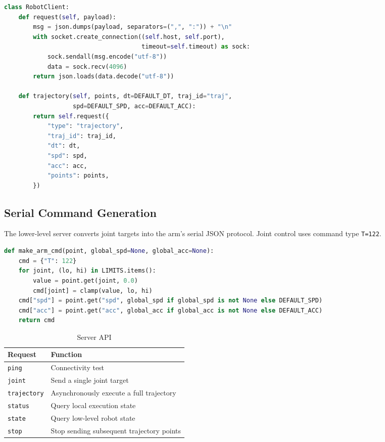 \documentclass[a4paper,12pt]{article}
\begin{document}
\begin{lstlisting}[language=Python, caption={Trajectory request in the upper-level client}]
class RobotClient:
    def request(self, payload):
        msg = json.dumps(payload, separators=(",", ":")) + "\n"
        with socket.create_connection((self.host, self.port),
                                      timeout=self.timeout) as sock:
            sock.sendall(msg.encode("utf-8"))
            data = sock.recv(4096)
        return json.loads(data.decode("utf-8"))

    def trajectory(self, points, dt=DEFAULT_DT, traj_id="traj",
                   spd=DEFAULT_SPD, acc=DEFAULT_ACC):
        return self.request({
            "type": "trajectory",
            "traj_id": traj_id,
            "dt": dt,
            "spd": spd,
            "acc": acc,
            "points": points,
        })
\end{lstlisting}

\subsection{Serial Command Generation}

The lower-level server converts joint targets into the arm's serial JSON protocol. Joint control uses command type \texttt{T=122}.

\begin{lstlisting}[language=Python, caption={Serial joint command generation}]
def make_arm_cmd(point, global_spd=None, global_acc=None):
    cmd = {"T": 122}
    for joint, (lo, hi) in LIMITS.items():
        value = point.get(joint, 0.0)
        cmd[joint] = clamp(value, lo, hi)
    cmd["spd"] = point.get("spd", global_spd if global_spd is not None else DEFAULT_SPD)
    cmd["acc"] = point.get("acc", global_acc if global_acc is not None else DEFAULT_ACC)
    return cmd
\end{lstlisting}

\begin{table}[H]
  \centering
  \caption{Server API}
  \begin{tabular}{ll}
    \toprule
    Request & Function \\
    \midrule
    \texttt{ping} & Connectivity test \\
    \texttt{joint} & Send a single joint target \\
    \texttt{trajectory} & Asynchronously execute a full trajectory \\
    \texttt{status} & Query local execution state \\
    \texttt{state} & Query low-level robot state \\
    \texttt{stop} & Stop sending subsequent trajectory points \\
    \bottomrule
  \end{tabular}
\end{table}
\end{document}
